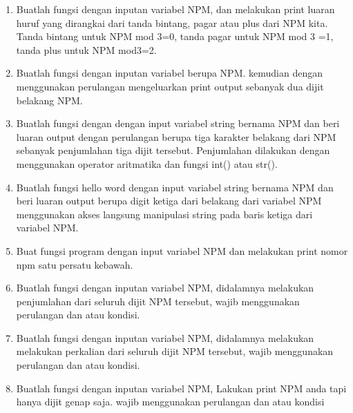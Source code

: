 \begin{enumerate}
\item Buatlah fungsi dengan inputan variabel NPM, dan melakukan print luaran huruf yang dirangkai dari tanda bintang, pagar atau plus dari NPM kita. Tanda bintang untuk NPM mod 3=0, tanda pagar untuk NPM mod 3 =1, tanda plus untuk NPM mod3=2.
    

\item Buatlah fungsi dengan inputan variabel berupa NPM. kemudian dengan menggunakan perulangan mengeluarkan print output sebanyak dua dijit belakang
NPM.
    
    
\item Buatlah fungsi dengan dengan input variabel string bernama NPM dan beri
luaran output dengan perulangan berupa tiga karakter belakang dari NPM sebanyak penjumlahan tiga dijit tersebut. Penjumlahan dilakukan dengan menggunakan operator aritmatika dan fungsi int() atau str().
    

\item Buatlah fungsi hello word dengan input variabel string bernama NPM dan beri luaran output berupa digit ketiga dari belakang dari variabel NPM menggunakan akses langsung manipulasi string pada baris ketiga dari variabel NPM.
    

\item Buat fungsi program dengan input variabel NPM dan melakukan print nomor npm satu persatu kebawah.
    

\item Buatlah fungsi dengan inputan variabel NPM, didalamnya melakukan penjumlahan dari seluruh dijit NPM tersebut, wajib menggunakan perulangan dan
atau kondisi.
    

\item Buatlah fungsi dengan inputan variabel NPM, didalamnya melakukan melakukan perkalian dari seluruh dijit NPM tersebut, wajib menggunakan perulangan dan atau kondisi.
    

\item Buatlah fungsi dengan inputan variabel NPM, Lakukan print NPM anda tapi hanya dijit genap saja. wajib menggunakan perulangan dan atau kondisi
    


\end{enumerate}
